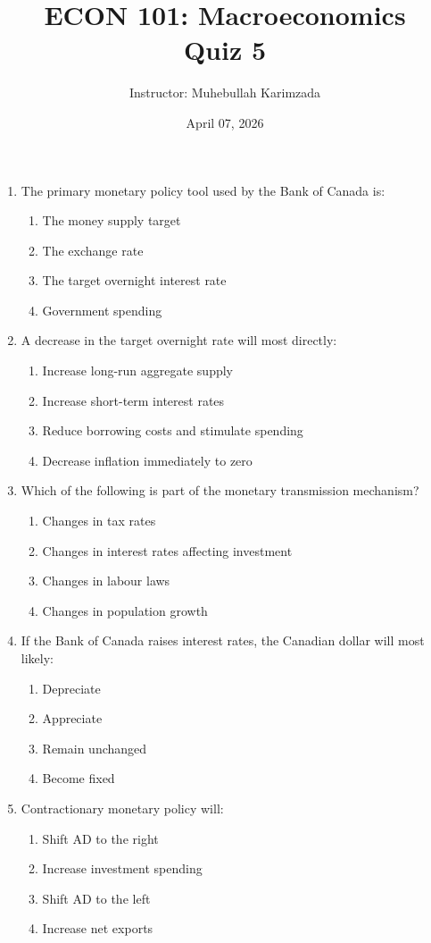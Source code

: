 \documentclass[12pt]{article}
\title{ECON 101: Macroeconomics \\ Quiz 5}
\author{Instructor: Muhebullah Karimzada}
\date{April 07,  2026}
\begin{document}
\maketitle



\begin{enumerate}[label=\textbf{\arabic*.}]

\item The primary monetary policy tool used by the Bank of Canada is:
\begin{enumerate}[label=(\Alph*)]
    \item The money supply target
    \item The exchange rate
    \item The target overnight interest rate
    \item Government spending
\end{enumerate}

\item A decrease in the target overnight rate will most directly:
\begin{enumerate}[label=(\Alph*)]
    \item Increase long-run aggregate supply
    \item Increase short-term interest rates
    \item Reduce borrowing costs and stimulate spending
    \item Decrease inflation immediately to zero
\end{enumerate}

\item Which of the following is part of the monetary transmission mechanism?
\begin{enumerate}[label=(\Alph*)]
    \item Changes in tax rates
    \item Changes in interest rates affecting investment
    \item Changes in labour laws
    \item Changes in population growth
\end{enumerate}

\item If the Bank of Canada raises interest rates, the Canadian dollar will most likely:
\begin{enumerate}[label=(\Alph*)]
    \item Depreciate
    \item Appreciate
    \item Remain unchanged
    \item Become fixed
\end{enumerate}
\newpage
\item Contractionary monetary policy will:
\begin{enumerate}[label=(\Alph*)]
    \item Shift AD to the right
    \item Increase investment spending
    \item Shift AD to the left
    \item Increase net exports
\end{enumerate}

\end{enumerate}
\end{document}
